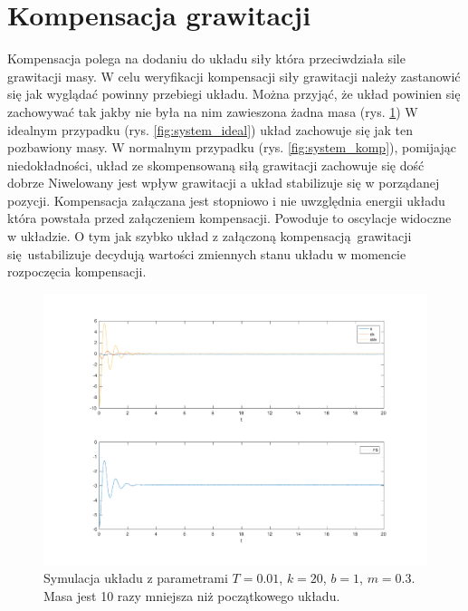 \documentclass[a4paper]{article}
\begin{document}
\section{Kompensacja grawitacji}
Kompensacja polega na dodaniu do układu siły która przeciwdziała sile grawitacji masy.
W celu weryfikacji kompensacji siły grawitacji należy zastanowić się jak wyglądać powinny przebiegi układu. Można przyjąć, że układ powinien się zachowywać tak jakby nie była na nim zawieszona żadna masa (rys. \ref{fig:systemwm})
W idealnym przypadku (rys. \ref{fig:system_ideal}) układ zachowuje się jak ten pozbawiony masy. W normalnym przypadku (rys. \ref{fig:system_komp}), pomijając niedokładności, układ ze skompensowaną siłą grawitacji  zachowuje się dość dobrze Niwelowany jest wpływ grawitacji a układ stabilizuje się w porządanej pozycji. Kompensacja załączana jest stopniowo i nie uwzględnia energii układu która powstała przed załączeniem kompensacji. Powoduje to oscylacje widoczne w układzie. O tym jak szybko układ z załączoną kompensacją grawitacji się ustabilizuje decydują wartości zmiennych stanu układu w momencie rozpoczęcia kompensacji.


\begin{figure}[H]
	\includegraphics[width=0.99\linewidth]{system_wm_sys}
	\centering
	\caption{Symulacja układu z parametrami $T=0.01$, $k = 20$, $b = 1$, $m = 0.3$. Masa jest 10 razy mniejsza niż początkowego układu.}
	\label{fig:systemwm}
\end{figure}
\end{document}
